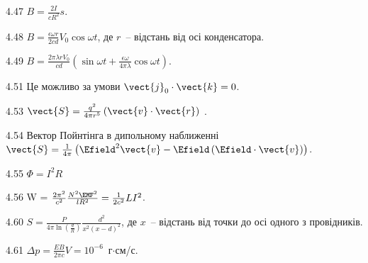 \begin{Solution}{4.{47}}
	$B = \frac{2I}{cR^2}s$.
\end{Solution}
\begin{Solution}{4.{48}}
	$B = \frac{\epsilon\omega r}{2cd}V_0\cos\omega t$, де $r$~-- відстань від осі конденсатора.
\end{Solution}
\begin{Solution}{4.{49}}
	$B = \frac{2\pi\lambda r V_0}{cd}\left( \sin\omega t + \frac{\epsilon \omega}{4\pi\lambda}\cos\omega t\right) $.
\end{Solution}
\begin{Solution}{4.{51}}
	Це можливо за умови $\vect{j}_0\cdot\vect{k} = 0$.
\end{Solution}
\begin{Solution}{4.{53}}
	$\vect{S} = \frac{q^2}{4\pi r^5} \left( \vect{v} \cdot \vect{r}\right)$ .
\end{Solution}
\begin{Solution}{4.{54}}
	Вектор Пойнтінга в дипольному наближенні $\vect{S} = \frac{1}{4\pi} \left( \Efield^2 \vect{v} - \Efield\left(\Efield\cdot\vect{v} \right) \right) $.
\end{Solution}
\begin{Solution}{4.{55}}
	$\Phi = I^2R$
\end{Solution}
\begin{Solution}{4.{56}}
	W = $\frac{2\pi^2}{c^2} \frac{N^2\EMF^2}{lR^2} = \frac{1}{2c^2} LI^2$.
\end{Solution}
\begin{Solution}{4.{60}}
	$S  = \frac{P}{4\pi\ln\left( \frac{d}{R} \right) } \frac{d^2}{x^2\left( x - d\right)^2 }$, де $x$~-- відстань від точки до осі одного з провідників.
\end{Solution}
\begin{Solution}{4.{61}}
	$\Delta p = \frac{EB}{2\pi c}V = 10^{-6}$~г$\cdot$см/с.
\end{Solution}
